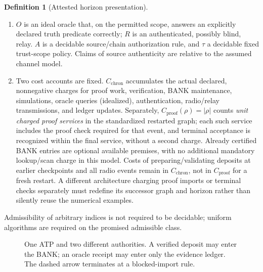 \documentclass[11pt,letterpaper]{article}
\theoremstyle{definition}
\newtheorem{definition}[theorem]{Definition}
\theoremstyle{remark}
\begin{document}
\begin{definition}[Attested horizon presentation]
\begin{enumerate}[label=(\roman*)]
\item $O$ is an ideal oracle that, on the permitted scope, answers an explicitly declared truth predicate correctly; $R$ is an authenticated, possibly blind, relay. $A$ is a decidable source/chain authorization rule, and $\tau$ a decidable fixed trust-scope policy. Claims of source authenticity are relative to the assumed channel model.
\item Two cost accounts are fixed. $C_{\mathrm{chron}}$ accumulates the actual declared, nonnegative charges for proof work, verification, BANK maintenance, simulations, oracle queries (idealized), authentication, radio/relay transmissions, and ledger updates. Separately, $C_{\mathrm{proof}}(\rho)=|\rho|$ counts \emph{unit charged proof services} in the standardized restarted graph; each such service includes the proof check required for that event, and terminal acceptance is recognized within the final service, without a second charge. Already certified BANK entries are optional available premises, with no additional mandatory lookup/scan charge in this model. Costs of preparing/validating deposits at earlier checkpoints and all radio events remain in $C_{\mathrm{chron}}$, not in $C_{\mathrm{proof}}$ for a fresh restart. A different architecture charging proof imports or terminal checks separately must redefine its successor graph and horizon rather than silently reuse the numerical examples.
\end{enumerate}
Admissibility of arbitrary indices is not required to be decidable; uniform algorithms are required on the promised admissible class.
\end{definition}

\begin{figure}[htbp]
\centering
{}
\caption{One ATP and two different authorities. A verified deposit may enter the BANK; an oracle receipt may enter only the evidence ledger. The dashed arrow terminates at a blocked-import rule.}
\end{figure}
\end{document}
